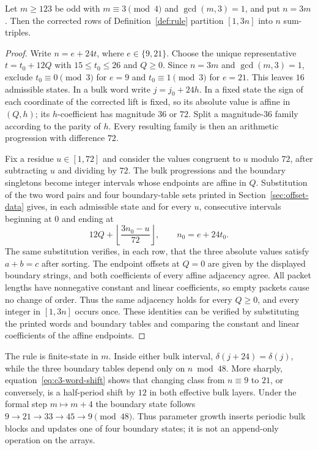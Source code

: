 \begin{lemma}\label{lem:rule}
Let $m\ge123$ be odd with $m\equiv3\pmod4$ and $\gcd(m,3)=1$, and put $n=3m$. Then the corrected
rows of Definition~\ref{def:rule} partition $[1,3n]$ into $n$ sum-triples.
\end{lemma}
\begin{proof}
Write $n=e+24t$, where $e\in\{9,21\}$. Choose the unique representative
$t=t_0+12Q$ with $15\le t_0\le26$ and $Q\ge0$. Since $n=3m$ and $\gcd(m,3)=1$, exclude
$t_0\equiv0\pmod3$ for $e=9$ and $t_0\equiv1\pmod3$ for $e=21$.  This leaves $16$ admissible
states.  In a bulk word write
$j=j_0+24h$.  In a fixed state the sign of each coordinate of the corrected lift is fixed, so its
absolute value is affine in $(Q,h)$; its $h$-coefficient has magnitude $36$ or $72$.  Split a
magnitude-$36$ family according to the parity of $h$.  Every resulting family is then an arithmetic
progression with difference $72$.

Fix a residue $u\in[1,72]$ and consider the values congruent to $u$ modulo $72$, after subtracting
$u$ and dividing by $72$. The bulk progressions and the boundary singletons become integer intervals
whose endpoints are affine in $Q$. Substitution of the two word pairs and four boundary-table sets printed in
Section~\ref{sec:offset-data} gives, in each admissible state and for every $u$, consecutive
intervals beginning at $0$ and ending at
\[
  12Q+\left\lfloor\frac{3n_0-u}{72}\right\rfloor,
  \qquad n_0=e+24t_0.
\]
The same substitution verifies, in each row, that the three absolute values satisfy
$a+b=c$ after sorting. The endpoint offsets at $Q=0$ are given by the displayed boundary strings,
and both coefficients of every affine adjacency agree. All packet lengths have nonnegative
constant and linear coefficients, so empty packets cause no change of order.
Thus the same adjacency holds for every $Q\ge0$, and every integer in $[1,3n]$ occurs once.
These identities can be verified by substituting the printed words and boundary tables
and comparing the constant and linear coefficients of the affine endpoints.
\end{proof}

The rule is finite-state in $m$.  Inside either bulk interval, $\delta(j+24)=\delta(j)$, while the
three boundary tables depend only on $n\bmod48$.  More sharply, equation~\eqref{eq:c3-word-shift}
shows that changing class from $n\equiv9$ to $21$, or conversely, is a half-period shift by $12$ in
both effective bulk layers.  Under the formal step $m\mapsto m+4$ the boundary state follows
$9\to21\to33\to45\to9\pmod{48}$.  Thus parameter growth inserts periodic bulk blocks and updates one
of four boundary states; it is not an append-only operation on the arrays.

